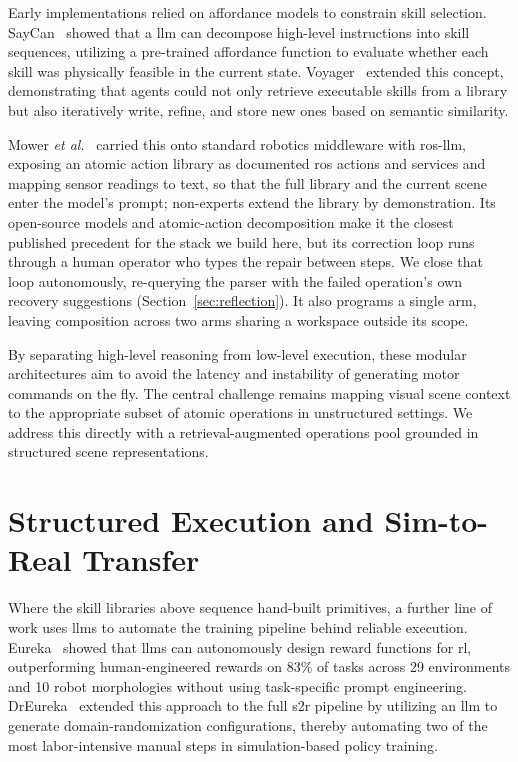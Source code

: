 Early implementations relied on affordance models to constrain skill selection. SayCan~\cite{ahn2022icanisay} showed that a \gls{llm} can decompose high-level instructions into skill sequences, utilizing a pre-trained affordance function to evaluate whether each skill was physically feasible in the current state. Voyager~\cite{wang2023voyageropenendedembodiedagent} extended this concept, demonstrating that agents could not only retrieve executable skills from a library but also iteratively write, refine, and store new ones based on semantic similarity.

Mower \emph{et al.}~\cite{Mower_2026} carried this onto standard robotics middleware with \gls{ros}-\gls{llm}, exposing an atomic action library as documented \gls{ros} actions and services and mapping sensor readings to text, so that the full library and the current scene enter the model's prompt; non-experts extend the library by demonstration. Its open-source models and atomic-action decomposition make it the closest published precedent for the stack we build here, but its correction loop runs through a human operator who types the repair between steps. We close that loop autonomously, re-querying the parser with the failed operation's own recovery suggestions (Section~\ref{sec:reflection}). It also programs a single arm, leaving composition across two arms sharing a workspace outside its scope.

By separating high-level reasoning from low-level execution, these modular architectures aim to avoid the latency and instability of generating motor commands on the fly. The central challenge remains mapping visual scene context to the appropriate subset of atomic operations in unstructured settings. We address this directly with a retrieval-augmented operations pool grounded in structured scene representations.

\section{Structured Execution and Sim-to-Real Transfer}
Where the skill libraries above sequence hand-built primitives, a further line of work uses \glspl{llm} to automate the training pipeline behind reliable execution. Eureka~\cite{ma2024eurekahumanlevelrewarddesign} showed that \glspl{llm} can autonomously design reward functions for \gls{rl}, outperforming human-engineered rewards on 83\% of tasks across 29 environments and 10 robot morphologies without using task-specific prompt engineering. DrEureka~\cite{ma2024dreurekalanguagemodelguided} extended this approach to the full \gls{s2r} pipeline by utilizing an \gls{llm} to generate domain-randomization configurations, thereby automating two of the most labor-intensive manual steps in simulation-based policy training.

